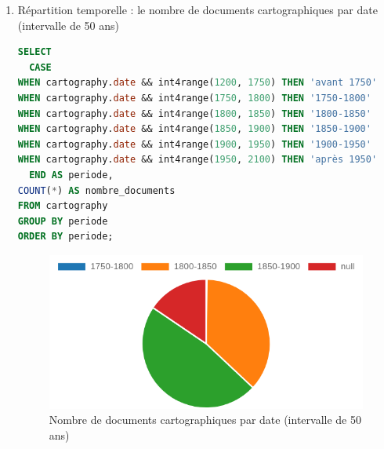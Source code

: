 \begin{enumerate}
\begin{enumerate}
\newpage   

        \item Répartition temporelle : le nombre de documents cartographiques par date (intervalle de 50 ans)
            \begin{lstlisting}[language=SQL, caption=Nombre de documents cartographiques par date (intervalle de 50 ans]
SELECT 
  CASE 
WHEN cartography.date && int4range(1200, 1750) THEN 'avant 1750' 
WHEN cartography.date && int4range(1750, 1800) THEN '1750-1800' 
WHEN cartography.date && int4range(1800, 1850) THEN '1800-1850' 
WHEN cartography.date && int4range(1850, 1900) THEN '1850-1900' 
WHEN cartography.date && int4range(1900, 1950) THEN '1900-1950' 
WHEN cartography.date && int4range(1950, 2100) THEN 'après 1950' 
  END AS periode, 
COUNT(*) AS nombre_documents 
FROM cartography 
GROUP BY periode 
ORDER BY periode;\end{lstlisting}
\begin{figure}[ht!]
    \centering
    \includegraphics[width=1\linewidth]{images/graphiques/nb_carto_date_50.png}
    \caption{Nombre de documents cartographiques par date (intervalle de 50 ans)}
    \label{fig:nb_carto_date50}
\end{figure}

\newpage            


\end{enumerate}
\end{enumerate}
